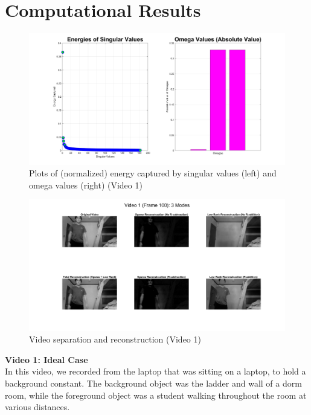 \documentclass{article}
\begin{document}
\section*{\fontsize{19}{15}\selectfont Computational Results}
\begin{figure}[H]
\begin{center}
\includegraphics[width = 12cm]{energy1}
\caption{\label{fig:scaled_diss} Plots of (normalized) energy captured by singular values (left) and omega values (right) (Video 1)}
\end{center}
\end{figure}
\begin{figure}[H]
\begin{center}
\includegraphics[width = 16cm]{vid1image}
\caption{\label{fig:scaled_diss} Video separation and reconstruction (Video 1)}
\end{center}
\end{figure}
\textbf{Video 1: Ideal Case} \\
In this video, we recorded from the laptop that was sitting on a laptop, to hold a background constant. The background object was the ladder and wall of a dorm room, while the foreground object was a student walking throughout the room at various distances. \\ \\
\end{document}
